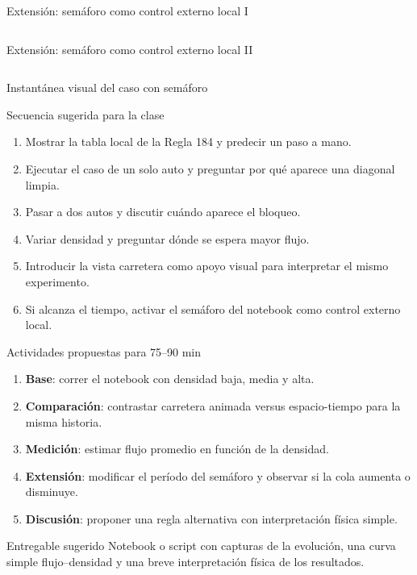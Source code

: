 \begin{frame}[fragile]{Extensión: semáforo como control externo local I}
\inputminted[fontsize=\tiny,baselinestretch=0.82,numbersep=2pt,firstline=1,lastline=23]{python}{codes/rule184_traffic_light.py}
\end{frame}

\begin{frame}[fragile]{Extensión: semáforo como control externo local II}
\inputminted[fontsize=\tiny,baselinestretch=0.82,numbersep=2pt,firstline=24,lastline=44]{python}{codes/rule184_traffic_light.py}
\end{frame}

\begin{frame}{Instantánea visual del caso con semáforo}
\centering

\end{frame}

\begin{frame}{Secuencia sugerida para la clase}
\begin{enumerate}
    \item Mostrar la tabla local de la Regla 184 y predecir un paso a mano.
    \item Ejecutar el caso de un solo auto y preguntar por qué aparece una diagonal limpia.
    \item Pasar a dos autos y discutir cuándo aparece el bloqueo.
    \item Variar densidad y preguntar dónde se espera mayor flujo.
    \item Introducir la vista carretera como apoyo visual para interpretar el mismo experimento.
    \item Si alcanza el tiempo, activar el semáforo del notebook como control externo local.
\end{enumerate}
\end{frame}

\begin{frame}{Actividades propuestas para 75--90 min}
\begin{enumerate}
    \item \textbf{Base}: correr el notebook con densidad baja, media y alta.
    \item \textbf{Comparación}: contrastar carretera animada versus espacio-tiempo para la misma historia.
    \item \textbf{Medición}: estimar flujo promedio en función de la densidad.
    \item \textbf{Extensión}: modificar el período del semáforo y observar si la cola aumenta o disminuye.
    \item \textbf{Discusión}: proponer una regla alternativa con interpretación física simple.
\end{enumerate}

\begin{block}{Entregable sugerido}
Notebook o script con capturas de la evolución, una curva simple flujo--densidad y una breve interpretación física de los resultados.
\end{block}
\end{frame}

